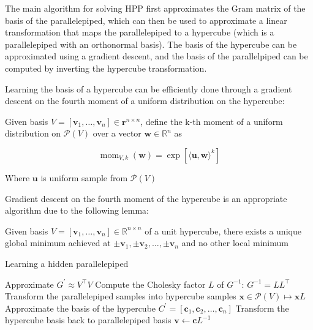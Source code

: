 The main algorithm for solving HPP first approximates the Gram matrix of the basis of the parallelepiped, which can then be used to approximate a linear transformation that maps the parallelepiped to a hypercube (which is a parallelepiped with an orthonormal basis). The basis of the hypercube can be approximated using a gradient descent, and the basis of the parallelpiped can be computed by inverting the hypercube transformation.

Learning the basis of a hypercube can be efficiently done through a gradient descent on the fourth moment of a uniform distribution on the hypercube:

\begin{definition}
    Given basis $V = [\mathbf{v}_1, \ldots, \mathbf{v}_n] \in \mathbf{r}^{n \times n}$, define the k-th moment of a uniform distribution on $\mathcal{P}(V)$ over a vector $\mathbf{w} \in \mathbb{R}^n$ as

    $$
    \operatorname{mom}_{V, k}(\mathbf{w}) = \exp[
        \langle \mathbf{u}, \mathbf{w} \rangle^k
    ]
    $$

    Where $\mathbf{u}$ is uniform sample from $\mathcal{P}(V)$
\end{definition}

Gradient descent on the fourth moment of the hypercube is an appropriate algorithm due to the following lemma:

\begin{lemma}
    Given basis $V = [\mathbf{v}_1, \ldots, \mathbf{v}_n] \in \mathbb{R}^{n \times n}$ of a unit hypercube, there exists a unique global minimum achieved at $\pm\mathbf{v}_1, \pm\mathbf{v}_2, \ldots, \pm\mathbf{v}_n$ and no other local minimum
\end{lemma}

\begin{algorithm}
\caption{Learning a hidden parallelepiped}
\begin{algorithmic}[1]
    \State Approximate $G^\prime \approx V^\intercal V$
    \State Compute the Cholesky factor $L$ of $G^{-1}$: $G^{-1} = LL^\intercal$
    \State Transform the parallelepiped samples into hypercube samples $\mathbf{x} \in \mathcal{P}(V) \mapsto \mathbf{x}L$
    \State Approximate the basis of the hypercube $C^\prime = [\mathbf{c}_1, \mathbf{c}_2, \ldots, \mathbf{c}_n]$
    \State Transform the hypercube basis back to parallelepiped basis $\mathbf{v} \leftarrow \mathbf{c}L^{-1}$
\end{algorithmic}
\end{algorithm}

